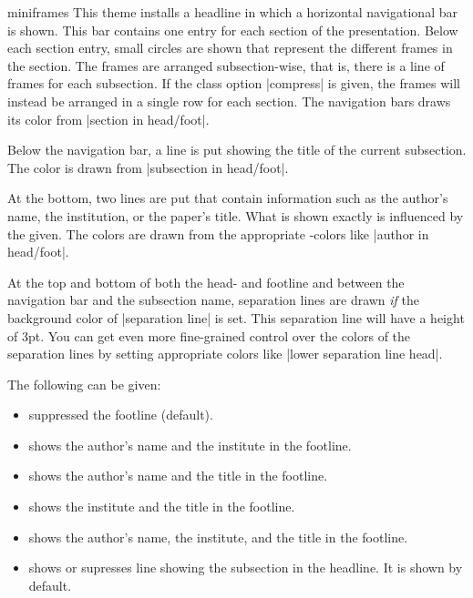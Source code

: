 \begin{layoutthemeexample}{miniframes}
  This theme installs a headline in which a horizontal navigational
  bar is shown. This bar contains one entry for each section of the
  presentation. Below each section entry, small circles are shown that
  represent the different frames in the section. The frames are
  arranged subsection-wise, that is, there is a line of frames for
  each subsection. If the class  option |compress| is given, the
  frames will instead be arranged in a single row for each
  section. The navigation bars draws its color from
  |section in head/foot|.

  Below the navigation bar, a line is put showing the title of the
  current subsection. The color is drawn from |subsection in head/foot|.

  At the bottom, two lines are put that contain information such as
  the author's name, the institution, or the paper's title. What is
  shown exactly is influenced by the  given. The colors
  are drawn from the appropriate \beamer-colors like
  |author in head/foot|.

  At the top and bottom of both the head- and footline and between the
  navigation bar and the subsection name, separation lines are drawn
  \emph{if} the background color of |separation line| is set. This
  separation line will have a height of 3pt. You can get even more
  fine-grained control over the colors of the separation lines by
  setting appropriate colors like |lower separation line head|.

  The following  can be given:
  \begin{itemize}
  \item {} suppressed the footline (default).
  \item {} shows the author's name
    and the institute in the footline.
  \item {} shows the author's name
    and the title in the footline.
  \item {} shows the institute
    and the title in the footline.
  \item {} shows the author's
    name, the institute, and the title in the footline.
  \item {} shows or supresses
    line showing the subsection in the headline. It is shown by
    default.
  \end{itemize}  
\end{layoutthemeexample}

